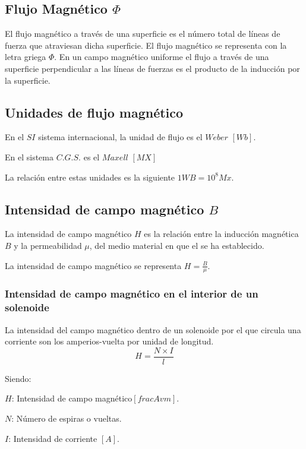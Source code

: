 \subsection{Flujo Magnético $\Phi$}

El flujo magnético a través de una superficie es el número total de líneas de fuerza que atraviesan dicha superficie.
El flujo magnético se representa con la letra griega $\Phi$.
En un campo magnético uniforme el flujo a través de una superficie perpendicular a las líneas de fuerzas es el producto de la inducción por la superficie.

\subsection {Unidades de flujo magnético}

En el $SI$ sistema internacional, la unidad de flujo es el $Weber$ $[Wb]$.

En el sistema $C.G.S.$ es el $Maxell$ $[MX]$

La relación entre estas unidades es la siguiente $1WB = 10^8Mx$.

\subsection{Intensidad de campo magnético $B$}

La intensidad de campo magnético $H$ es la relación entre la inducción magnética $B$ y la permeabilidad $\mu$, del medio material en que el se ha establecido.

La intensidad de campo magnético se representa $H= \frac{B}{\mu}$.

\subsubsection{Intensidad de campo magnético en el interior de un solenoide}

La intensidad del campo magnético dentro de un solenoide por el que circula una corriente son los amperios-vuelta por unidad de longitud.
\begin{equation*}
    H=\frac{N \times I}{l}
\end{equation*}

Siendo:

$H$: Intensidad de campo magnético$ [frac{Av}{m}]$.

$N$: Número de espiras o vueltas.

$I$: Intensidad de corriente $[A]$.

